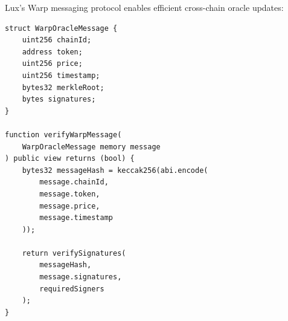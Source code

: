 Lux's Warp messaging protocol enables efficient cross-chain oracle updates:

\begin{lstlisting}[caption={Warp Oracle Message Structure}]
struct WarpOracleMessage {
    uint256 chainId;
    address token;
    uint256 price;
    uint256 timestamp;
    bytes32 merkleRoot;
    bytes signatures;
}

function verifyWarpMessage(
    WarpOracleMessage memory message
) public view returns (bool) {
    bytes32 messageHash = keccak256(abi.encode(
        message.chainId,
        message.token,
        message.price,
        message.timestamp
    ));
    
    return verifySignatures(
        messageHash,
        message.signatures,
        requiredSigners
    );
}
\end{lstlisting}

